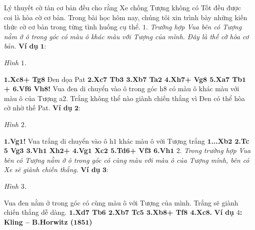 \vspace*{155pt}
\begin{multicols}{2}
	Lý thuyết cờ tàn cơ bản đều cho rằng Xe chống Tượng không có Tốt đều được coi là hòa cờ cơ bản.
	\vskip 0.1cm
	Trong bài học hôm nay, chúng tôi xin trình bày những kiến thức cờ cơ bản trong từng tình huống cụ thể.
	\vskip 0.1cm
	$1.$ \textit{Trường hợp Vua bên có Tượng nằm ở ô trong góc có màu ô khác màu với Tượng của mình. Đây là thế cờ hòa cơ bản.}
	\vskip 0.1cm 
	\textbf{\color{gocco}Ví dụ} $\pmb{1}$: 
	\begin{center}
		\newgame
		\scalebox{0.85}\showboard
		\vskip 0.1cm
		\textit{\small\color{gocco}Hình $1$.}
	\end{center}
	\textbf{\color{gocco}$\pmb{1}$.Xc$\pmb{8}$+ Tg$\pmb{8}$} Đen dọa Pat \textbf{\color{gocco}$\pmb{2}$.Xc$\pmb{7}$ Tb$\pmb{3}$ $\pmb{3}$.Xb$\pmb{7}$ Ta$\pmb{2}$ $\pmb{4}$.Xh$\pmb{7}$+ Vg$\pmb{8}$ $\pmb{5}$.Xa$\pmb{7}$ Tb$\pmb{1}$+ $\pmb{6}$.Vf$\pmb{6}$ Vh$\pmb{8}$!}
	\vskip 0.1cm
	Vua đen di chuyển vào ô trong góc h$8$ có màu ô khác màu với màu ô của Tượng a$2$.
	\vskip 0.1cm
	Trắng không thể  nào giành chiến thắng vì Đen có thể hòa cờ nhờ thế Pat.
	\vskip 0.1cm
	\textbf{\color{gocco}Ví dụ} $\pmb{2}$: 
	\begin{center}
		\newgame
		\scalebox{0.85}\showboard
		\vskip 0.1cm
		\textit{\small\color{gocco}Hình $2$.}
	\end{center}
	\textbf{\color{gocco}$\pmb{1}$.Vg$\pmb{1}$!} Vua trắng di chuyển vào ô h$1$ khác màu ô với Tượng trắng \textbf{\color{gocco}$\pmb{1}$...Xb$\pmb{2}$ $\pmb{2}$.Tc$\pmb{5}$ Vg$\pmb{3}$ $\pmb{3}$.Vh$\pmb{1}$ Xh$\pmb{2}$+ $\pmb{4}$.Vg$\pmb{1}$ Xc$\pmb{2}$ $\pmb{5}$.Td$\pmb{6}$+ Vf$\pmb{3}$ $\pmb{6}$.Vh$\pmb{1}$}
	\vskip 0.1cm
	$2$. \textit{Trong trường hợp Vua bên có Tượng nằm ở ô trong góc có cùng màu với màu ô của Tượng mình, bên có Xe sẽ  giành chiến thắng.}
	\vskip 0.1cm
	\textbf{\color{gocco}Ví dụ} $\pmb{3}$: 
	\begin{center}
		\newgame
		\scalebox{0.85}\showboard
		\vskip 0.1cm
		\textit{\small\color{gocco}Hình $3$.}
	\end{center}
	Vua đen nằm ở trong góc có cùng màu ô với Tượng của mình. Trắng sẽ giành chiến thắng dễ dàng.
	\vskip 0.1cm
	\textbf{\color{gocco}$\pmb{1}$.Xd$\pmb{7}$ Tb$\pmb{6}$ $\pmb{2}$.Xb$\pmb{7}$ Tc$\pmb{5}$ $\pmb{3}$.Xb$\pmb{8}$+ Tf$\pmb{8}$ $\pmb{4}$.Xc$\pmb{8}$.}
	\vskip 0.1cm
	\textbf{\color{gocco}Ví dụ $4$: Kling -- B.Horwitz ($\pmb{1851}$)}

\end{multicols}
